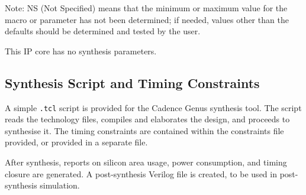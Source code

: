 \noindent
\small{Note: NS (Not Specified) means that the minimum or maximum value for the macro or parameter has not been determined; if needed, values other than the defaults should be determined and tested by the user.} 

\else

This IP core has no synthesis parameters.

\fi


\subsection{Synthesis Script and Timing Constraints}

A simple {\tt .tcl} script is provided for the Cadence Genus synthesis tool. The
script reads the technology files, compiles and elaborates the design, and
proceeds to synthesise it. The timing constraints are contained within the
constraints file provided, or provided in a separate file.

After synthesis, reports on silicon area usage, power consumption, and timing
closure are generated. A post-synthesis Verilog file is created, to be used in
post-synthesis simulation.


